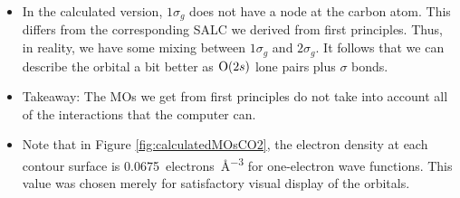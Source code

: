 \documentclass[../notes.tex]{subfiles}
\begin{document}
\begin{itemize}
    \begin{itemize}
        \item In the calculated version, $1\sigma_g$ does not have a node at the carbon atom. This differs from the corresponding SALC we derived from first principles. Thus, in reality, we have some mixing between $1\sigma_g$ and $2\sigma_g$. It follows that we can describe the orbital a bit better as $\ce{O}(2s)$ lone pairs plus  $\sigma$ bonds.
        \item Takeaway: The MOs we get from first principles do not take into account all of the interactions that the computer can.
        \item Note that in Figure \ref{fig:calculatedMOsCO2}, the electron density at each contour surface is \SI[per-mode=symbol]{0.0675}{electrons\per\cubic\angstrom} for one-electron wave functions. This value was chosen merely for satisfactory visual display of the orbitals.
    \end{itemize}
\end{itemize}
\end{document}
